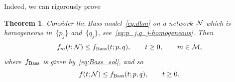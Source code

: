 \documentclass[review]{elsarticle}
\newtheorem{theorem}{Theorem}
\begin{document}
%  
Indeed, we can rigorously prove 
\begin{theorem}
	\label{thm:bass_largest}
	Consider the Bass model~\eqref{eq:dbm}
	on a network~${\cal N}$
	which is homogeneous in~$\{p_j\}$ and~$\{q_j\}$, see~\eqref{eq:p_j,q_j-homogeneous}. 
Then
	\begin{equation}
		\label{eq:f_m<=f_Bass}
		f_{m}(t;{\cal N}) \leq f_{\rm Bass}(t;p,q), \qquad t \ge 0, \qquad m \in {\cal M},
	\end{equation}
	where~$f_{\rm Bass}$ is given by~\eqref{eq:Bass_sol}, and so
	\begin{equation}
		\label{eq:f<=f_Bass}
		f(t;{\cal N})\leq f_{\rm Bass}(t;p,q), \qquad t \ge 0.
	\end{equation}
\end{theorem}
\end{document}

